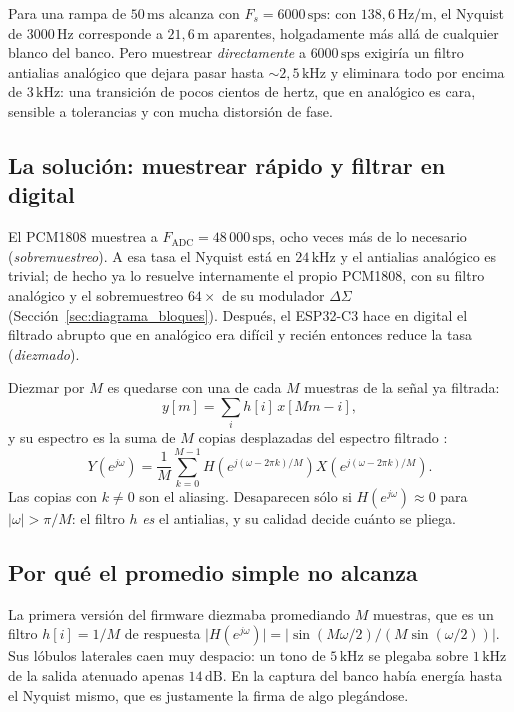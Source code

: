 Para una rampa de $50\,\text{ms}$ alcanza con $F_s = 6000\,\text{sps}$:
con $138{,}6\,\text{Hz/m}$, el Nyquist de $3000\,\text{Hz}$ corresponde a
$21{,}6\,\text{m}$ aparentes, holgadamente más allá de cualquier blanco del
banco. Pero muestrear \emph{directamente} a $6000\,\text{sps}$ exigiría un
filtro antialias analógico que dejara pasar hasta $\sim 2{,}5\,\text{kHz}$ y
eliminara todo por encima de $3\,\text{kHz}$: una transición de pocos cientos
de hertz, que en analógico es cara, sensible a tolerancias y con mucha
distorsión de fase.

\subsection{La solución: muestrear rápido y filtrar en digital}

El PCM1808 muestrea a $F_\text{ADC} = 48\,000\,\text{sps}$, ocho veces más
de lo necesario (\emph{sobremuestreo}). A esa tasa el Nyquist está en
$24\,\text{kHz}$ y el antialias analógico es trivial; de hecho ya lo resuelve
internamente el propio PCM1808, con su filtro analógico y el sobremuestreo
$64\times$ de su modulador $\Delta\Sigma$
(Sección~\ref{sec:diagrama_bloques}). Después, el ESP32-C3 hace en digital
el filtrado abrupto que en analógico era difícil y recién entonces reduce la
tasa (\emph{diezmado}).

Diezmar por $M$ es quedarse con una de cada $M$ muestras de la señal ya
filtrada:
\begin{equation}
  y[m] = \sum_{i} h[i]\, x[Mm - i],
  \label{eq:proc_diezmado}
\end{equation}
y su espectro es la suma de $M$ copias desplazadas del espectro filtrado
\cite{Crochiere1983, Proakis2006}:
\begin{equation}
  Y\!\left(e^{j\omega}\right) = \frac{1}{M}\sum_{k=0}^{M-1}
  H\!\left(e^{j(\omega - 2\pi k)/M}\right)
  X\!\left(e^{j(\omega - 2\pi k)/M}\right).
  \label{eq:proc_alias}
\end{equation}
Las copias con $k \neq 0$ son el aliasing. Desaparecen sólo si
$H(e^{j\omega}) \approx 0$ para $\lvert\omega\rvert > \pi/M$: el filtro
$h$ \emph{es} el antialias, y su calidad decide cuánto se pliega.

\subsection{Por qué el promedio simple no alcanza}

La primera versión del firmware diezmaba promediando $M$ muestras, que es un
filtro $h[i] = 1/M$ de respuesta
$\lvert H(e^{j\omega})\rvert = \lvert\sin(M\omega/2)/(M\sin(\omega/2))\rvert$.
Sus lóbulos laterales caen muy despacio: un tono de $5\,\text{kHz}$ se
plegaba sobre $1\,\text{kHz}$ de la salida atenuado apenas $14\,\text{dB}$.
En la captura del banco había energía hasta el Nyquist mismo, que es
justamente la firma de algo plegándose.

